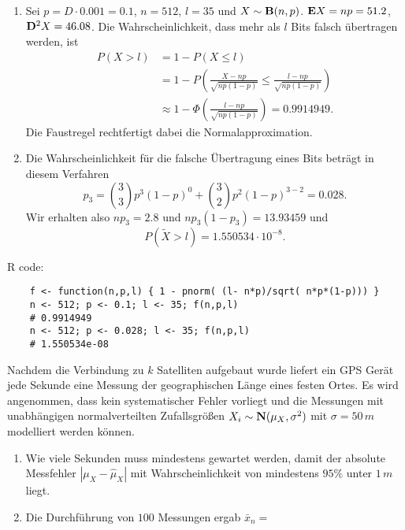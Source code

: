 \solution
\begin{enumerate}
    \item Sei $p = D\cdot{} 0.001 = 0.1$, $n=512$, $l=35$ und $X \sim \mathbf B(n,
        p)$. $\mathbf E X = np= 51.2$, $\mathbf D^2 X = 46.08$. Die Wahrscheinlichkeit,
        dass mehr als $l$ Bits falsch übertragen werden, ist 
        \begin{align*}
            P\left( X > l \right) &= 1 - P\left( X \leq l \right) \\
            &= 1- P\left( \frac{X - np}{\sqrt{np(1-p)}} \leq \frac{l -np}{ \sqrt{np(1-p)}} \right) \\
            &\approx 1 - \Phi\left( \frac{l -np}{ \sqrt{np(1-p)}}  \right) =  0.9914949.
        \end{align*}
        Die Faustregel rechtfertigt dabei die Normalapproximation. 
    \item Die Wahrscheinlichkeit für die falsche Übertragung eines Bits beträgt
        in diesem Verfahren
        \begin{equation*}
            p_3 = \binom{3}{3} p^{3}\left( 1-p \right)^{0} + \binom{3}{2} p^{2} \left( 1-p \right)^{3-2} = 
            0.028.
        \end{equation*}
        Wir erhalten also $n p_3 = 2.8$ und $n p_3 (1-p_3) = 13.93459$ und
        \begin{equation*}
            P\left( \tilde X > l \right) =  1.550534 \cdot{} 10^{-8}. 
        \end{equation*}
\end{enumerate} 
R code:
\begin{lstlisting}
    f <- function(n,p,l) { 1 - pnorm( (l- n*p)/sqrt( n*p*(1-p))) }
    n <- 512; p <- 0.1; l <- 35; f(n,p,l)
    # 0.9914949
    n <- 512; p <- 0.028; l <- 35; f(n,p,l)
    # 1.550534e-08
\end{lstlisting}


 Nachdem die Verbindung zu $k$ Satelliten aufgebaut wurde
liefert ein GPS Gerät jede Sekunde eine Messung der geographischen Länge eines
festen Ortes. Es wird angenommen, dass kein systematischer Fehler vorliegt und
die Messungen mit unabhängigen normalverteilten Zufallsgrößen $X_i \sim
\mathbf N(\mu_X, \sigma^2)$ mit $\sigma=50\,m$ modelliert werden können.
\begin{enumerate}
    \item Wie viele Sekunden muss mindestens gewartet werden, damit der
        absolute Messfehler $| \mu_{X} - \hat \mu_{X} |$ mit Wahrscheinlichkeit
        von mindestens $95\%$ unter $1\,m$ liegt.


    \item Die Durchführung von $100$ Messungen ergab $\bar x_{n} = $
\end{enumerate}


